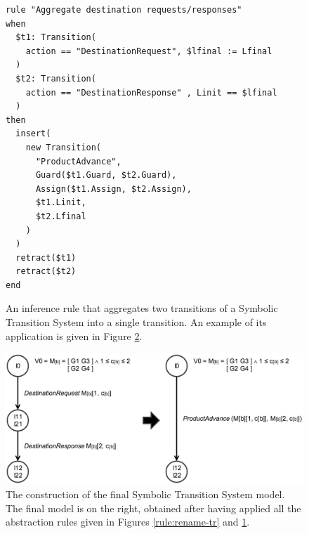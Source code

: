 \begin{figure}[ht]
\begin{framed}
\begin{BVerbatim}
rule "Aggregate destination requests/responses"
when
  $t1: Transition(
    action == "DestinationRequest", $lfinal := Lfinal
  )
  $t2: Transition(
    action == "DestinationResponse" , Linit == $lfinal
  )
then
  insert(
    new Transition(
      "ProductAdvance",
      Guard($t1.Guard, $t2.Guard),
      Assign($t1.Assign, $t2.Assign),
      $t1.Linit,
      $t2.Lfinal
    )
  )
  retract($t1)
  retract($t2)
end
\end{BVerbatim}
\end{framed}

  \caption{An inference rule that aggregates two transitions of a
  Symbolic Transition System into a single transition. An example
  of its application is given in Figure \ref{fig:finalmodel}.}
  \label{rule:aggregate-tr}
\end{figure}

\begin{figure}[ht]
    \begin{center}
        \includegraphics[width=1.0\linewidth]{figures/STSfinal.png}
    \end{center}

    \caption{The construction of the final Symbolic Transition
    System model. The final model is on the right, obtained after
    having applied all the abstraction rules given in Figures
    \ref{rule:rename-tr} and \ref{rule:aggregate-tr}.}
	\label{fig:finalmodel}
\end{figure}


